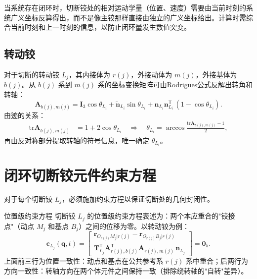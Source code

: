 \documentclass[10pt,a4paper]{book}
\theoremstyle{thmstyle}
\theoremstyle{defstyle}
\theoremstyle{prostyle}
\newcommand{\tr}{\mathrm{tr}}
\newcommand{\T}{^{\mathsf{T}}}
\renewcommand{\vec}[1]{\bm{#1}}
\newcommand{\mat}[1]{\bm{#1}}
\newcommand{\tildev}[1]{\tilde{#1}}
\begin{document}
当系统存在闭环时，切断铰处的相对运动学量（位置、速度）需要由当前时刻的系统广义坐标反算得出，而不是像主铰那样直接由独立的广义坐标给出。计算时需综合当前时刻和上一时刻的信息，以防止闭环量发生数值突变。

\subsection{转动铰}

对于切断的转动铰 $L_j$，其内接体为 $r(j)$，外接动体为 $m(j)$，外接基体为 $b(j)$。从 $b(j)$ 系到 $m(j)$ 系的坐标变换矩阵可由Rodrigues公式反解出转角和转轴：
\[
\mat{A}_{b(j),m(j)} = \mat{I}_3\cos\theta_{L_i} + \tildev{\vec{n}}_{L_i}\sin\theta_{L_i}
+ \vec{n}_{L_i}\vec{n}_{L_i}\T\,(1-\cos\theta_{L_i}).
\]
由迹的关系：
\begin{align}
\tr\mat{A}_{b(j),m(j)} &= 1 + 2\cos\theta_{L_i}
\quad\Longrightarrow\quad \theta_{L_i} = \arccos\frac{\tr\mat{A}_{b(j),m(j)} - 1}{2},
\end{align}
再由反对称部分提取转轴的符号信息，唯一确定 $\theta_{L_i}$。


\section{闭环切断铰元件约束方程}

对于每个切断铰 $L_j$，必须施加约束方程以保证切断处的几何封闭性。

\begin{mydefinition}{位置级约束方程}
切断铰 $L_j$ 的位置级约束方程表述为：两个本应重合的"铰接点"（动点 $M_j$ 和基点 $B_j$）之间的位移为零。以转动铰为例：
\[
\vec{c}_{L_j}(\vec{q},t) =
\begin{bmatrix}
\vec{r}_{O_{r(j)}M_j|r(j)} - \vec{r}_{O_{r(j)}B_j|r(j)} \\[4pt]
\mat{T}_{L_j}\T\mat{A}_{r(j),b(j)}\T\mat{A}_{r(j),m(j)}\,\vec{n}_{L_j}
\end{bmatrix}
= \vec{0}_5.
\]
上面前三行为位置一致性：动点和基点在公共参考系 $r(j)$ 系中重合；后两行为方向一致性：转轴方向在两个体元件之间保持一致（排除绕转轴的"自转"差异）。
\end{mydefinition}
\end{document}
